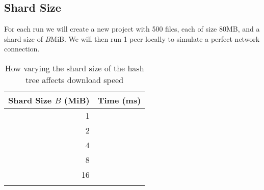 \subsection*{Shard Size}

For each run we will create a new project with 500 files, each of size 80MB, and a shard size of $B$MiB. We will then run 1 peer locally to simulate a perfect network connection.

\begin{longtable}{ | r | r | }
  \hline
  \textbf{Shard Size $B$ (MiB)} & \textbf{Time (ms)} \\\hline
  1
  &
  \\\hline
  2
  &
  \\\hline
  4
  &
  \\\hline
  8
  &
  \\\hline
  16
  &
  \\\hline
  \caption{How varying the shard size of the hash tree affects download speed}
\end{longtable}